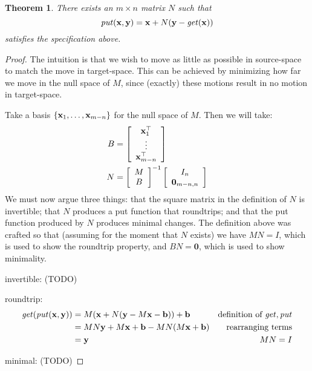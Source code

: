 \documentclass{article}
\newtheorem{theorem}{Theorem}
\begin{document}
\newcommand{\transpose}{^\top}
\begin{theorem}
    There exists an $m \times n$ matrix $N$ such that
    \[\mathit{put}(\mathbf x,\mathbf y) = \mathbf x + N(\mathbf y - \mathit{get}(\mathbf x))\]
    satisfies the specification above.
\end{theorem}
\begin{proof}
    The intuition is that we wish to move as little as possible in
    source-space to match the move in target-space. This can be achieved by
    minimizing how far we move in the null space of $M$, since (exactly)
    these motions result in no motion in target-space.

    Take a basis $\{\mathbf x_1,\ldots,\mathbf x_{m-n}\}$ for the null space of $M$. Then
    we will take:
    \begin{align*}
        B &= \left[\begin{array}{c}
                \x_1\transpose \\
                \vdots \\
                \x_{m-n}\transpose
            \end{array}\right] \\
        N &= \left[\begin{array}{c}
                M \\
                B
            \end{array}\right]^{-1}
            \left[\begin{array}{c}
                I_n \\
                \mathbf 0_{m-n,n}
            \end{array}\right] \\
    \end{align*}
    We must now argue three things: that the square matrix in the definition
    of $N$ is invertible; that $N$ produces a put function that roundtrips;
    and that the put function produced by $N$ produces minimal changes. The
    definition above was crafted so that (assuming for the moment that $N$
    exists) we have $MN = I$, which is used to show the roundtrip property,
    and $BN = \mathbf 0$, which is used to show minimality.

    invertible: (TODO)

    roundtrip:
        \begin{align*}
            \mathit{get}(\mathit{put}(\mathbf x,\mathbf y))
                &= M(\mathbf x+N(\mathbf y-M\mathbf x-\mathbf b))+\mathbf b & \mbox{definition of }\mathit{get},\mathit{put} \\
                &= MN\mathbf y + M\mathbf x + \mathbf b - MN(M\mathbf x + \mathbf b) & \mbox{rearranging terms} \\
                &= \mathbf y & MN=I
        \end{align*}

    minimal: (TODO)
\end{proof}
\end{document}
